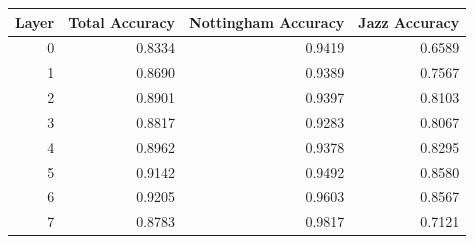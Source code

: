 \begin{tabular}{rrrr}
\toprule
Layer & Total Accuracy & Nottingham Accuracy & Jazz Accuracy \\
\midrule
0 & 0.8334 & 0.9419 & 0.6589 \\
1 & 0.8690 & 0.9389 & 0.7567 \\
2 & 0.8901 & 0.9397 & 0.8103 \\
3 & 0.8817 & 0.9283 & 0.8067 \\
4 & 0.8962 & 0.9378 & 0.8295 \\
5 & 0.9142 & 0.9492 & 0.8580 \\
6 & 0.9205 & 0.9603 & 0.8567 \\
7 & 0.8783 & 0.9817 & 0.7121 \\
\bottomrule
\end{tabular}
